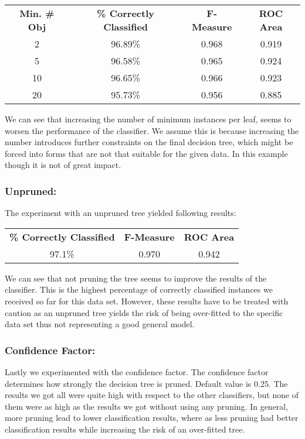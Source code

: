 \documentclass{article}
\begin{document}
\begin{center}
\begin{tabular}{ c | c | c | c}
\textbf{Min. \# Obj} & \textbf{\% Correctly Classified} & \textbf{F-Measure} & \textbf{ROC Area}\\
2  & 96.89\% & 0.968 & 0.919\\
5  & 96.58\% & 0.965 & 0.924\\
10 & 96.65\% & 0.966 & 0.923\\
20 & 95.73\% & 0.956 & 0.885\\
\end{tabular}
\end{center}

We can see that increasing the number of minimum instances per leaf, seems to worsen the performance of the classifier. We assume this is because increasing the number introduces further constraints on the final decision tree, which might be forced into forms that are not that suitable for the given data. In this example though it is not of great impact.

\subsubsection{Unpruned:}
The experiment with an unpruned tree yielded following results:

\begin{center}
\begin{tabular}{c | c | c}
\textbf{\% Correctly Classified} & \textbf{F-Measure} & \textbf{ROC Area}\\
97.1\% & 0.970 & 0.942\\
\end{tabular}
\end{center}

We can see that not pruning the tree seems to improve the results of the classifier. This is the highest percentage of correctly classified instances we received so far for this data set. However, these results have to be treated with caution as an unpruned tree yields the risk of being over-fitted to the specific data set thus not representing a good general model.

\subsubsection{Confidence Factor:}
Lastly we experimented with the confidence factor. The confidence factor determines how strongly the decision tree is pruned. Default value is 0.25. The results we got all were quite high with respect to the other classifiers, but none of them were as high as the results we got without using any pruning. In general, more pruning lead to lower classification results, where as less pruning had better classification results while increasing the risk of an over-fitted tree. 
\end{document}
